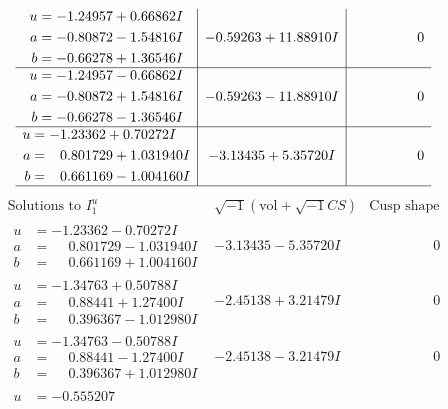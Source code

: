 \documentclass[1p]{elsarticle_modified}
\theoremstyle{definition}
\newcommand{\I}{\sqrt{-1}}
\begin{document}
$$\begin{array}{c|c|c}
\begin{aligned}
u &= -1.24957 + 0.66862 I \\
a &= -0.80872 - 1.54816 I \\
b &= -0.66278 + 1.36546 I\end{aligned}
 & -0.59263 + 11.88910 I & \phantom{-0.000000 } 0 \\ \hline\begin{aligned}
u &= -1.24957 - 0.66862 I \\
a &= -0.80872 + 1.54816 I \\
b &= -0.66278 - 1.36546 I\end{aligned}
 & -0.59263 - 11.88910 I & \phantom{-0.000000 } 0 \\ \hline\begin{aligned}
u &= -1.23362 + 0.70272 I \\
a &= \phantom{-}0.801729 + 1.031940 I \\
b &= \phantom{-}0.661169 - 1.004160 I\end{aligned}
 & -3.13435 + 5.35720 I & \phantom{-0.000000 } 0\\
 \hline 
 \end{array}$$\newpage$$\begin{array}{c|c|c}  
\text{Solutions to }I^u_{1}& \I (\text{vol} + \sqrt{-1}CS) & \text{Cusp shape}\\
 \hline 
\begin{aligned}
u &= -1.23362 - 0.70272 I \\
a &= \phantom{-}0.801729 - 1.031940 I \\
b &= \phantom{-}0.661169 + 1.004160 I\end{aligned}
 & -3.13435 - 5.35720 I & \phantom{-0.000000 } 0 \\ \hline\begin{aligned}
u &= -1.34763 + 0.50788 I \\
a &= \phantom{-}0.88441 + 1.27400 I \\
b &= \phantom{-}0.396367 - 1.012980 I\end{aligned}
 & -2.45138 + 3.21479 I & \phantom{-0.000000 } 0 \\ \hline\begin{aligned}
u &= -1.34763 - 0.50788 I \\
a &= \phantom{-}0.88441 - 1.27400 I \\
b &= \phantom{-}0.396367 + 1.012980 I\end{aligned}
 & -2.45138 - 3.21479 I & \phantom{-0.000000 } 0 \\ \hline\begin{aligned}
u &= -0.555207\phantom{ +0.000000I} \\

\end{aligned}
\end{array}$$
\end{document}
